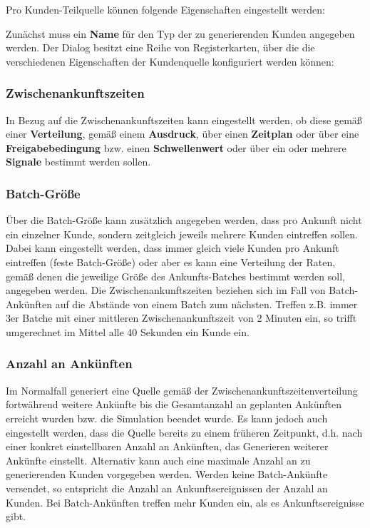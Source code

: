 Pro Kunden-Teilquelle können folgende Eigenschaften eingestellt werden: 

Zunächst muss ein \textbf{Name} für den Typ der zu generierenden Kunden angegeben werden.
Der Dialog besitzt eine Reihe von Registerkarten, über die die verschiedenen Eigenschaften
der Kundenquelle konfiguriert werden können:

\subsubsection*{Zwischenankunftszeiten}

In Bezug auf die Zwischenankunftszeiten kann eingestellt werden, ob diese gemäß einer
\textbf{Verteilung}, gemäß einem \textbf{Ausdruck}, über einen \textbf{Zeitplan} oder über eine
\textbf{Freigabebedingung} bzw. einen \textbf{Schwellenwert} oder über
ein oder mehrere \textbf{Signale} bestimmt werden sollen.

\subsubsection*{Batch-Größe}

Über die Batch-Größe kann zusätzlich
angegeben werden, dass pro Ankunft nicht ein einzelner Kunde, sondern zeitgleich jeweils
mehrere Kunden eintreffen sollen. Dabei kann eingestellt werden, dass immer gleich
viele Kunden pro Ankunft eintreffen (feste Batch-Größe) oder aber es kann eine Verteilung
der Raten, gemäß denen die jeweilige Größe des Ankunfts-Batches bestimmt werden soll,
angegeben werden.
Die Zwischenankunftszeiten beziehen sich im Fall von Batch-Ankünften auf die Abstände von
einem Batch zum nächsten. Treffen z.B. immer 3er Batche mit einer mittleren Zwischenankunftszeit
von 2 Minuten ein, so trifft umgerechnet im Mittel alle 40 Sekunden ein Kunde ein.

\subsubsection*{Anzahl an Ankünften}

Im Normalfall generiert eine Quelle gemäß der Zwischenankunftszeitenverteilung fortwährend
weitere Ankünfte bis die Gesamtanzahl an geplanten Ankünften erreicht wurden bzw. die Simulation beendet wurde.
Es kann jedoch auch eingestellt werden, dass die Quelle bereits zu einem früheren Zeitpunkt,
d.h. nach einer konkret einstellbaren Anzahl an Ankünften, das Generieren weiterer Ankünfte einstellt.
Alternativ kann auch eine maximale Anzahl an zu generierenden Kunden vorgegeben werden.
Werden keine Batch-Ankünfte versendet, so entspricht die Anzahl an Ankunftsereignissen der
Anzahl an Kunden. Bei Batch-Ankünften treffen mehr Kunden ein, als es Ankunftsereignisse gibt.

